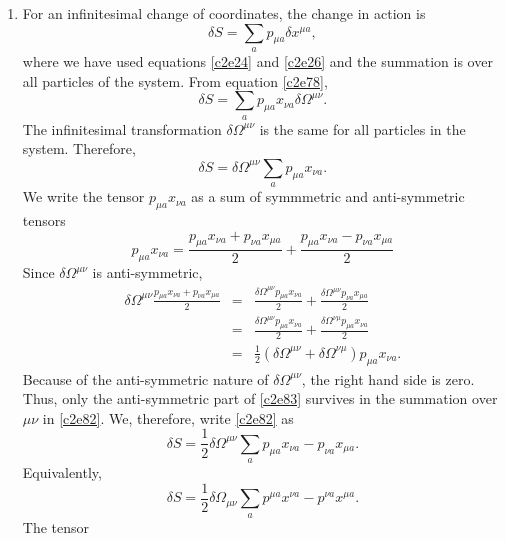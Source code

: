 \begin{enumerate}
\item For an infinitesimal change of coordinates, the change in action is
\begin{equation}\label{c2e80}
\delta S = \sum_{a} p_{\mu a}\delta x^{\mu a},
\end{equation}
where we have used equations \eqref{c2e24} and \eqref{c2e26} and the summation
is over all particles of the system. From equation \eqref{c2e78},
\begin{equation}\label{c2e81}
\delta S = \sum_{a} p_{\mu a}x_{\nu a}\delta\Omega^{\mu\nu}.
\end{equation}
The infinitesimal transformation $\delta\Omega^{\mu\nu}$ is the same for all
particles in the system. Therefore,
\begin{equation}\label{c2e82}
\delta S = \delta\Omega^{\mu\nu}\sum_{a} p_{\mu a}x_{\nu a}.
\end{equation}
We write the tensor $p_{\mu a}x_{\nu a}$ as a sum of symmmetric and 
anti-symmetric tensors
\begin{equation}\label{c2e83}
p_{\mu a}x_{\nu a} = \frac{p_{\mu a}x_{\nu a} + p_{\nu a}x_{\mu a}}{2} +
\frac{p_{\mu a}x_{\nu a} - p_{\nu a}x_{\mu a}}{2}
\end{equation}
Since $\delta\Omega^{\mu\nu}$ is anti-symmetric,
\begin{eqnarray*}
\delta\Omega^{\mu\nu}\frac{p_{\mu a}x_{\nu a} + p_{\nu a}x_{\mu a}}{2} &=&
\frac{\delta\Omega^{\mu\nu}p_{\mu a}x_{\nu a}}{2} + 
\frac{\delta\Omega^{\mu\nu}p_{\nu a}x_{\mu a}}{2} \\
 &=& \frac{\delta\Omega^{\mu\nu}p_{\mu a}x_{\nu a}}{2} + 
\frac{\delta\Omega^{\nu\mu}p_{\mu a}x_{\nu a}}{2} \\
 &=& \frac{1}{2}(\delta\Omega^{\mu\nu} + \delta\Omega^{\nu\mu})
 p_{\mu a}x_{\nu a}.
\end{eqnarray*}
Because of the anti-symmetric nature of $\delta\Omega^{\mu\nu}$, the right hand 
side is zero. Thus, only the anti-symmetric part of \eqref{c2e83} survives in
the summation over $\mu\nu$ in \eqref{c2e82}. We, therefore, write \eqref{c2e82}
as
\begin{equation}\label{c2e84}
\delta S = 
\frac{1}{2}\delta\Omega^{\mu\nu}\sum_{a}p_{\mu a}x_{\nu a} - p_{\nu a}x_{\mu a}.
\end{equation}
Equivalently,
\begin{equation}\label{c2e85}
\delta S = 
\frac{1}{2}\delta\Omega_{\mu\nu}\sum_{a}p^{\mu a}x^{\nu a} - p^{\nu a}x^{\mu a}.
\end{equation}
The tensor
\begin{equation}\label{c2e86}

\end{equation}
\end{enumerate}
